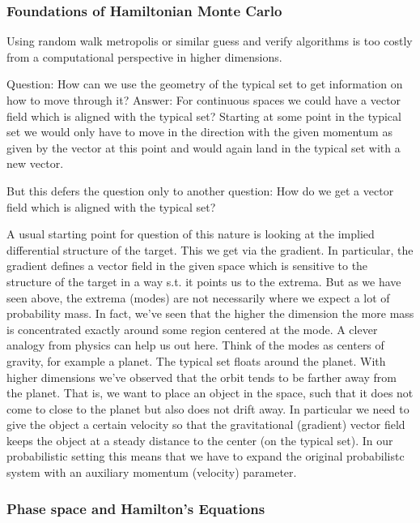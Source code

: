 \subsubsection{Foundations of Hamiltonian Monte Carlo}
Using random walk metropolis or similar guess and verify algorithms is too costly
from a computational perspective in higher dimensions.

Question: How can we use the geometry of the typical set to get information
on how to move through it?
Answer: For continuous spaces we could have a vector field which is aligned with the typical set?
Starting at some point in the typical set we would only have to move in the direction with
the given momentum as given by the vector at this point and would again land in the typical set with a new vector.

But this defers the question only to another question: How do we get a vector field
which is aligned with the typical set?

A usual starting point for question of this nature is looking at the implied differential structure of the target.
This we get via the gradient. In particular, the gradient defines a vector field in the given space which is
sensitive to the structure of the target in a way s.t. it points us to the extrema.
But as we have seen above, the extrema (modes) are not necessarily where we expect
a lot of probability mass. In fact, we've seen that the higher the dimension the more
mass is concentrated exactly around some region centered at the mode.
A clever analogy from physics can help us out here. Think of the modes as centers of gravity, for example a planet.
The typical set floats around the planet. With higher dimensions we've observed that
the orbit tends to be farther away from the planet. That is, we want to place an object
in the space, such that it does not come to close to the planet but also does not drift away.
In particular we need to give the object a certain velocity so that the gravitational (gradient)
vector field keeps the object at a steady distance to the center (on the typical set).
In our probabilistic setting this means that we have to expand the original probabilistc system with
an auxiliary momentum (velocity) parameter.

\subsubsection*{Phase space and Hamilton's Equations}
